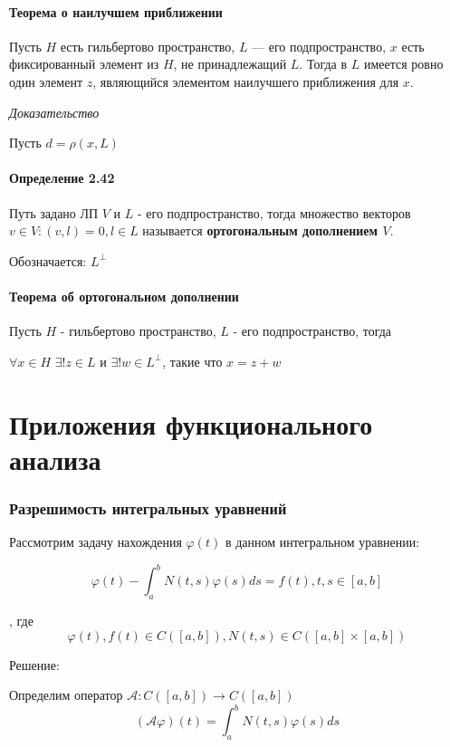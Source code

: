 \documentclass[12pt]{article}
\begin{document}
\subsection*{Теорема о наилучшем приближении}
	
	Пусть $H$ есть гильбертово пространство, $L$ — его подпространство, $x$ есть фиксированный элемент из $H$, не принадлежащий $L$. Тогда в $L$ имеется ровно один элемент $z$, являющийся элементом
наилучшего приближения для $x$.
	
\textit{Доказательство}
	
		Пусть $d = \rho(x, L)$ 
	
	
	
	
	
\subsection*{Определение 2.42}
	Путь задано ЛП $V$ и $L$ - его подпространство, тогда множество векторов $v \in V : (v , l) = 0 , l \in L$ называется \textbf{ортогональным дополнением $V$}.
	
	Обозначается: $L^{\perp}$	
	
\subsection*{Теорема об ортогональном дополнении}	
	Пусть $H$ - гильбертово пространство, $L$ - его подпространство, тогда 
	
	$\forall x \in H$ $\exists ! z \in L$ и $\exists ! w \in L^{\perp}$, такие что 
	$x = z + w$
	
	
	
\part{Приложения функционального анализа}

\section{Разрешимость интегральных уравнений}

Рассмотрим задачу нахождения $\varphi(t)$ в данном интегральном уравнении:

$$\varphi(t) - \int_a^b N(t,s)\varphi(s)ds = f(t), t,s \in [a,b]  $$

, где $$\varphi(t), f(t) \in C([a,b]), N(t,s)  \in C([a,b] \times  [a,b])$$	
	
Решение:

	Определим оператор $\mathcal{A}: C([a,b]) \to  C([a,b])$ 
	$$(\mathcal{A}\varphi)(t) = \int_a^b N(t,s)\varphi(s)ds$$
	
\end{document}
